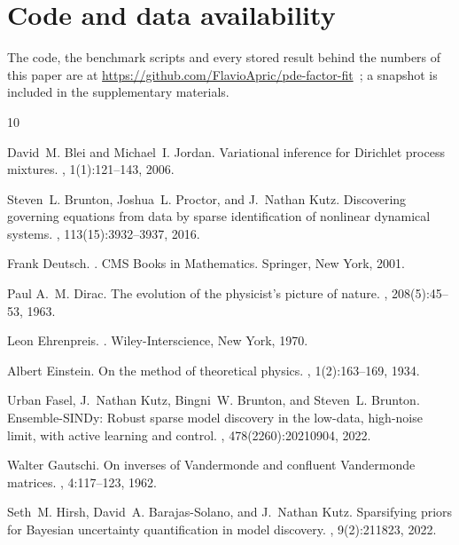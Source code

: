 \documentclass[11pt]{article}
\theoremstyle{plain}
\theoremstyle{definition}
\theoremstyle{remark}
\begin{document}
\section*{Code and data availability}
The code, the benchmark scripts and every stored result behind the numbers of this paper are at
\url{https://github.com/FlavioApric/pde-factor-fit}~\cite{Pri26code}; a snapshot is included in the supplementary
materials.


\begin{thebibliography}{10}

David~M. Blei and Michael~I. Jordan.
\newblock Variational inference for {D}irichlet process mixtures.
, 1(1):121--143, 2006.

Steven~L. Brunton, Joshua~L. Proctor, and J.~Nathan Kutz.
\newblock Discovering governing equations from data by sparse identification of
  nonlinear dynamical systems.
,
  113(15):3932--3937, 2016.

Frank Deutsch.
.
\newblock CMS Books in Mathematics. Springer, New York, 2001.

Paul A.~M. Dirac.
\newblock The evolution of the physicist's picture of nature.
, 208(5):45--53, 1963.

Leon Ehrenpreis.
.
\newblock Wiley-Interscience, New York, 1970.

Albert Einstein.
\newblock On the method of theoretical physics.
, 1(2):163--169, 1934.

Urban Fasel, J.~Nathan Kutz, Bingni~W. Brunton, and Steven~L. Brunton.
\newblock Ensemble-{SINDy}: Robust sparse model discovery in the low-data,
  high-noise limit, with active learning and control.
, 478(2260):20210904, 2022.

Walter Gautschi.
\newblock On inverses of {V}andermonde and confluent {V}andermonde matrices.
, 4:117--123, 1962.

Seth~M. Hirsh, David~A. Barajas-Solano, and J.~Nathan Kutz.
\newblock Sparsifying priors for {B}ayesian uncertainty quantification in model
  discovery.
, 9(2):211823, 2022.


\end{thebibliography}
\end{document}
